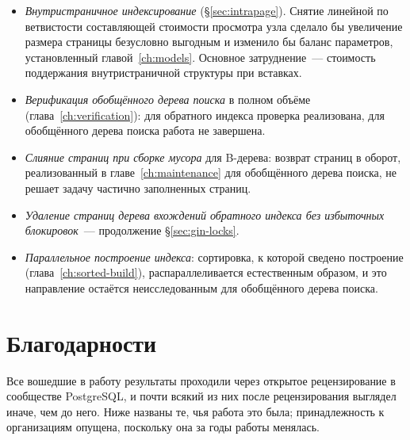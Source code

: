 \begin{itemize}

\item \emph{Внутристраничное индексирование} (§\ref{sec:intrapage}). Снятие
линейной по ветвистости составляющей стоимости просмотра узла сделало бы
увеличение размера страницы безусловно выгодным и изменило бы баланс
параметров, установленный главой~\ref{ch:models}. Основное затруднение~---
стоимость поддержания внутристраничной структуры при вставках.

\item \emph{Верификация обобщённого дерева поиска} в полном объёме
(глава~\ref{ch:verification}): для обратного индекса проверка реализована,
для обобщённого дерева поиска работа не завершена.

\item \emph{Слияние страниц при сборке мусора} для B-дерева: возврат страниц в
оборот, реализованный в главе~\ref{ch:maintenance} для обобщённого дерева
поиска, не решает задачу частично заполненных страниц.

\item \emph{Удаление страниц дерева вхождений обратного индекса без избыточных
блокировок}~--- продолжение §\ref{sec:gin-locks}.

\item \emph{Параллельное построение индекса}: сортировка, к которой сведено
построение (глава~\ref{ch:sorted-build}), распараллеливается естественным
образом, и это направление остаётся неисследованным для обобщённого дерева
поиска.

\end{itemize}

\section*{Благодарности}

%

Все вошедшие в работу результаты проходили через открытое рецензирование в
сообществе PostgreSQL, и почти всякий из них после рецензирования выглядел
иначе, чем до него. Ниже названы те, чья работа это была; принадлежность к
организациям опущена, поскольку она за годы работы менялась.

